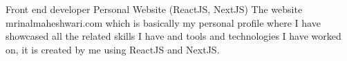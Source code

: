 \begin{cventries}

  \cventry
    {Front end developer}
    {Personal Website \tiny(ReactJS, NextJS)} %
    {} %
    {} %
    {
        The website mrinalmaheshwari.com which is basically my personal profile where I have showcased all the related skills I have and tools and technologies I have worked on, it is created by me using ReactJS and NextJS.
    }





\end{cventries}